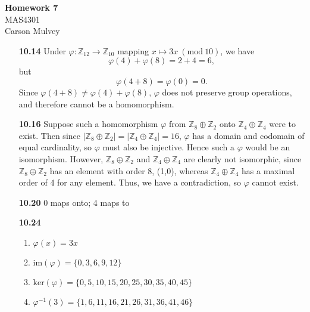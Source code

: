 \documentclass[11pt,letterpaper]{article}
\newcommand{\bb}[1]{\mathbb{#1}}
\newcommand{\Mod}[1]{\ (\mathrm{mod}\ #1)}
\begin{document}
\begin{center}
    \begin{large}
        \textbf{Homework 7} \\
        MAS4301 \\
        Carson Mulvey
    \end{large}
\end{center}

\begin{enumerate}
\item[\textbf{10.14}] Under $\varphi\colon \bb{Z}_{12} \to \bb{Z}_{10}$ mapping $x\mapsto 3x \Mod{10}$, we have
\[
    \varphi(4)+\varphi(8)=2+4=6,
\]
but
\[
    \varphi(4+8)=\varphi(0)=0.
\]
Since $\varphi(4+8)\neq \varphi(4)+\varphi(8)$, $\varphi$ does not preserve group operations, and therefore cannot be a homomorphism.
\item[\textbf{10.16}] Suppose such a homomorphism $\varphi$ from $\bb{Z}_8 \oplus \bb{Z}_2$ onto $\bb{Z}_4 \oplus \bb{Z}_4$ were to exist. Then since $|\bb{Z}_8 \oplus \bb{Z}_2|=|\bb{Z}_4 \oplus \bb{Z}_4|=16$, $\varphi$ has a domain and codomain of equal cardinality, so $\varphi$ must also be injective. Hence such a $\varphi$ would be an isomorphism. However, $\bb{Z}_8 \oplus \bb{Z}_2$ and $\bb{Z}_4 \oplus \bb{Z}_4$ are clearly not isomorphic, since $\bb{Z}_8 \oplus \bb{Z}_2$ has an element with order 8, (1,0), whereas $\bb{Z}_4 \oplus \bb{Z}_4$ has a maximal order of 4 for any element. Thus, we have a contradiction, so $\varphi$ cannot exist.
\item[\textbf{10.20}] 0 maps onto; 4 maps to
\item[\textbf{10.24}]
\begin{enumerate}
    \item $\varphi(x)=3x$
    \item $\text{im}(\varphi)=\{0,3,6,9,12\}$
    \item $\text{ker}(\varphi)=\{0,5,10,15,20,25,30,35,40,45\}$
    \item $\varphi^{-1}(3)=\{1,6,11,16,21,26,31,36,41,46\}$
\end{enumerate}
\end{enumerate}
\end{document}
